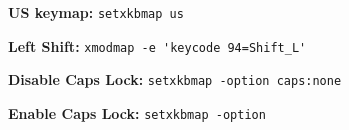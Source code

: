 \textbf{US keymap: }\verb|setxkbmap us|

\textbf{Left Shift: }\verb|xmodmap -e 'keycode 94=Shift_L'|

\textbf{Disable Caps Lock: }\verb|setxkbmap -option caps:none|

\textbf{Enable Caps Lock: }\verb|setxkbmap -option|


